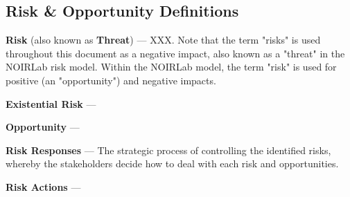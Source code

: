 \subsection{Risk \& Opportunity Definitions}
\label{sec:definitions}

\textbf{Risk} (also known as \textbf{Threat}) ---
XXX.
Note that the term "risks" is used throughout this document as a negative impact, also known as a "threat" in the NOIRLab risk model.
Within the NOIRLab model, the term "risk" is used for positive (an "opportunity") and negative impacts.

\textbf{Existential Risk} --- 

\textbf{Opportunity} --- 

\textbf{Risk Responses} ---
The strategic process of controlling the identified risks, whereby the stakeholders decide how to deal with each risk and opportunities.

\textbf{Risk Actions} --- 
